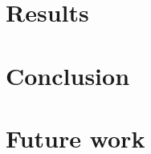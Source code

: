 \documentclass[
  footinclude=true,
  headinclude=true
]{report}
\begin{document}
\chapter{Results}
\label{chp:results}




\chapter{Conclusion}
\label{chp:conclusion}





\chapter{Future work}
\label{chp:future-work}





\printbibliography[heading=bibintoc, title={References}]



\begin{appendices}
    
    
\end{appendices}
\end{document}
